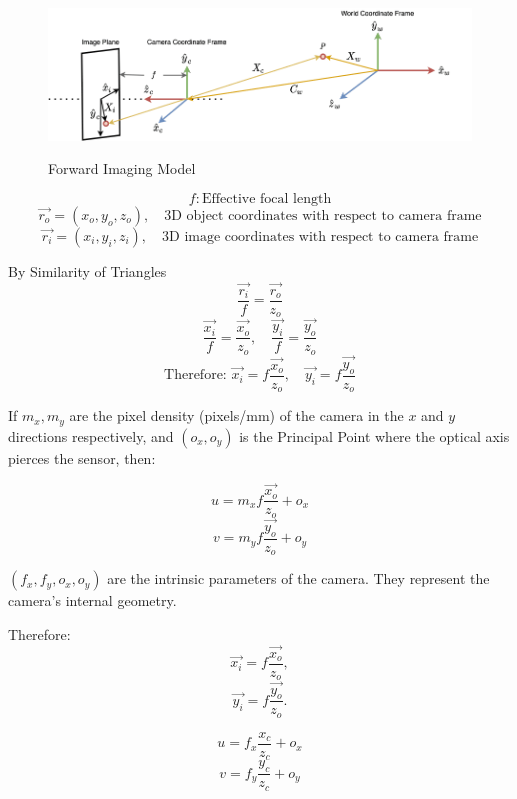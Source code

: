 \begin{figure}[!t]
	\centering
	\includegraphics[scale=0.5]{images/forward_imaging_model.png} \\
	\caption{ Forward Imaging Model }
	\label{fig: Forward Imaging Model }
\end{figure}

\[
	f: \text{Effective focal length}
\]
\[
	\overrightarrow{r_o} = (x_o, y_o, z_o), \quad \text{3D object coordinates with respect to camera frame}
\]
\[
	\overrightarrow{r_i} = (x_i, y_i, z_i), \quad \text{3D image coordinates with respect to camera frame}
\]

By Similarity of Triangles
\[
	\frac{\overrightarrow{r_i}}{f} = \frac{\overrightarrow{r_o}}{z_o}
\]
\[
	\frac{\overrightarrow{x_i}}{f} = \frac{\overrightarrow{x_o}}{z_o}, \quad \frac{\overrightarrow{y_i}}{f} = \frac{\overrightarrow{y_o}}{z_o}
\]
\[
	\text{Therefore: } \overrightarrow{x_i} = f \frac{\overrightarrow{x_o}}{z_o}, \quad \overrightarrow{y_i} = f \frac{\overrightarrow{y_o}}{z_o}
\]

If $m_x, m_y$ are the pixel density (pixels/mm) of the camera in the $x$ and $y$ directions respectively, and $(o_x, o_y)$ is the Principal Point where the optical axis pierces the sensor, then:

\[
	u = m_x f \frac{\overrightarrow{x_o}}{z_o} + o_x
\]
\[
	v = m_y f \frac{\overrightarrow{y_o}}{z_o} + o_y
\]

$(f_x, f_y, o_x, o_y)$ are the intrinsic parameters of the camera. They represent the camera's internal geometry.

Therefore:
\[
	\overrightarrow{x_i} = f \frac{\overrightarrow{x_o}}{z_o},
\]
\[
	\overrightarrow{y_i} = f \frac{\overrightarrow{y_o}}{z_o}.
\]



\[
	u = f_x \frac{x_c}{z_c} + o_x
\]
\[
	v = f_y \frac{y_c}{z_c} + o_y
\]

